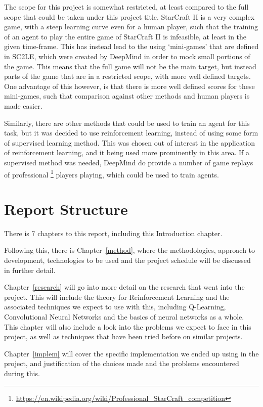 The scope for this project is somewhat restricted, at least compared to the full
scope that could be taken under this project title. StarCraft II is a very complex
game, with a steep learning curve even for a human player, such that the training
of an agent to play the entire game of StarCraft II is infeasible, at least in the
given time-frame. This has instead lead to the using `mini-games' that are defined
in SC2LE, which were created by DeepMind in order to mock small portions of the
game. This means that the full game will not be the main target, but instead
parts of the game that are in a restricted scope, with more well defined targets.
One advantage of this however, is that there is more well defined scores for
these mini-games, such that comparison against other methods and human players is
made easier.

Similarly, there are other methods that could be used to train an agent for this
task, but it was decided to use reinforcement learning, instead of using some
form of supervised learning method. This was chosen out of interest in the
application of reinforcement learning, and it being used more prominently
in this area.
If a supervised method was needed, DeepMind
do provide a number of game replays of professional%
\footnote{\url{https://en.wikipedia.org/wiki/Professional_StarCraft_competition}}
players playing, which could
be used to train agents.

\section{Report Structure}

There is 7 chapters to this report, including this Introduction chapter.

Following this, there is Chapter~\ref{method}, where the methodologies,
approach to development, technologies to be used and the project
schedule will be discussed in further detail.

Chapter~\ref{research} will go into more detail on the research that went into
the project. This will include the theory for Reinforcement Learning and the
associated techniques we expect to use with this, including Q-Learning,
Convolutional Neural Networks and the basics of neural networks as a
whole. This chapter will also include a look into the problems we
expect to face in this project, as well as techniques that have been tried
before on similar projects.

Chapter~\ref{implem} will cover the specific implementation we ended up using
in the project, and justification of the choices made and the problems
encountered during this.


